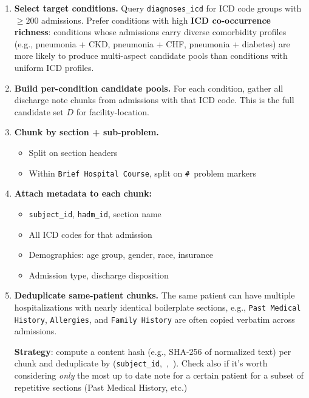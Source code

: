 \documentclass[11pt,a4paper]{article}
\newcommand{\field}[1]{\nolinkurl{#1}}
\begin{document}
\begin{enumerate}[leftmargin=*, itemsep=2mm]
	\item \textbf{Select target conditions.}  Query \field{diagnoses\_icd}
	      for ICD code groups with $\geq 200$ admissions.\newline
	      Prefer conditions with high \textbf{ICD co-occurrence richness}: conditions whose admissions carry diverse comorbidity profiles (e.g., pneumonia + CKD, pneumonia + CHF, pneumonia + diabetes) are more likely to produce multi-aspect candidate pools than conditions with uniform ICD profiles.

	\item \textbf{Build per-condition candidate pools.}  For each condition, gather all discharge note chunks from admissions with that ICD code. This is the full candidate set $D$ for facility-location.

	\item \textbf{Chunk by section + sub-problem.}
	      \begin{itemize}[itemsep=2pt, parsep=1pt]
		      \item Split on section headers
		      \item Within \texttt{Brief Hospital Course}, split on \texttt{\#}~problem markers
	      \end{itemize}

	\item \textbf{Attach metadata to each chunk:}
	      \begin{itemize}[itemsep=2pt, parsep=1pt]
		      \item \field{subject\_id}, \field{hadm\_id}, section name
		      \item All ICD codes for that admission
		      \item Demographics: age group, gender, race, insurance
		      \item Admission type, discharge disposition
	      \end{itemize}

	\item \textbf{Deduplicate same-patient chunks.}
	      The same patient can have multiple hospitalizations with nearly identical boilerplate sections, e.g., \texttt{Past Medical History}, \texttt{Allergies}, and \texttt{Family History} are often copied verbatim across admissions.

	      \textbf{Strategy}: compute a content hash (e.g., SHA-256 of normalized text) per chunk and deduplicate by (\field{subject\_id},\, ,\, ). Check also if it's worth considering \emph{only} the most up to date note for a certain patient for a subset of repetitive sections (Past Medical History, etc.)
\end{enumerate}
\end{document}
